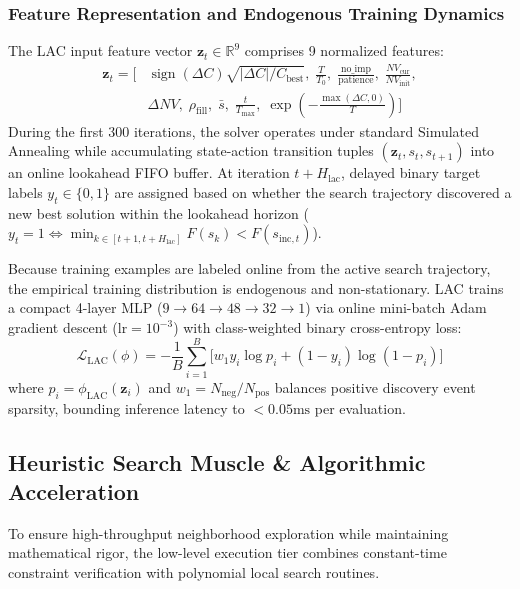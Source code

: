 \documentclass{ieeeaccess}
\begin{document}
\subsubsection{Feature Representation and Endogenous Training Dynamics}
The LAC input feature vector $\mathbf{z}_t \in \mathbb{R}^9$ comprises 9 normalized features:
\begin{align}
  \mathbf{z}_t = \Big[ 
    &\operatorname{sign}(\Delta C)\sqrt{|\Delta C| / C_{\text{best}}}, \; \frac{T}{T_0}, \; \frac{\text{no\_imp}}{\text{patience}}, \; \frac{NV_{\text{cur}}}{NV_{\text{init}}}, \nonumber \\
    &\Delta NV, \; \rho_{\text{fill}}, \; \bar{s}, \; \frac{t}{T_{\max}}, \; \exp\left(-\frac{\max(\Delta C, 0)}{T}\right) \Big]
  \label{eq:lac_features}
\end{align}
During the first 300 iterations, the solver operates under standard Simulated Annealing while accumulating state-action transition tuples $( \mathbf{z}_t, s_t, s_{t+1} )$ into an online lookahead FIFO buffer. At iteration $t + H_{\text{lac}}$, delayed binary target labels $y_t \in \{0, 1\}$ are assigned based on whether the search trajectory discovered a new best solution within the lookahead horizon ($y_t = 1 \iff \min_{k \in [t+1, t+H_{\text{lac}}]} F(s_k) < F(s_{\text{inc}, t})$).

Because training examples are labeled online from the active search trajectory, the empirical training distribution is endogenous and non-stationary. LAC trains a compact 4-layer MLP ($9 \to 64 \to 48 \to 32 \to 1$) via online mini-batch Adam gradient descent ($\text{lr} = 10^{-3}$) with class-weighted binary cross-entropy loss:
\begin{equation}
  \mathcal{L}_{\text{LAC}}(\phi) = -\frac{1}{B} \sum_{i=1}^B \Big[ w_1 y_i \log p_i + (1 - y_i) \log (1 - p_i) \Big]
  \label{eq:lac_loss}
\end{equation}
where $p_i = \phi_{\text{LAC}}(\mathbf{z}_i)$ and $w_1 = N_{\text{neg}} / N_{\text{pos}}$ balances positive discovery event sparsity, bounding inference latency to $< 0.05\text{ms}$ per evaluation.

\subsection{Heuristic Search Muscle \& Algorithmic Acceleration}
\label{sec:search_muscle}

To ensure high-throughput neighborhood exploration while maintaining mathematical rigor, the low-level execution tier combines constant-time constraint verification with polynomial local search routines.
\end{document}
